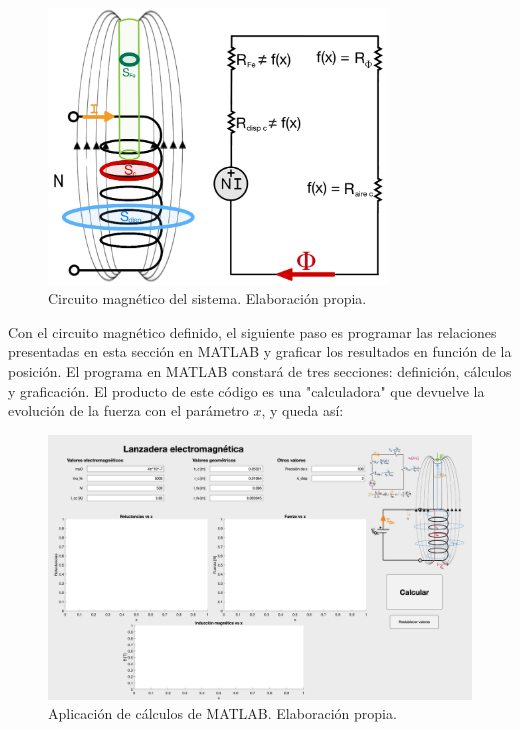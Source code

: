 \begin{figure}[H]
    \centering
    \includegraphics[width=9cm]{FigurasMemoria/circuitoMag.jpg}
    \caption{Circuito magnético del sistema. Elaboración propia.}
    \label{fig:circuitoMag} %
\end{figure}

Con el circuito magnético definido, el siguiente paso es programar las relaciones presentadas en esta sección en MATLAB y graficar los resultados en función de la posición. El programa en MATLAB constará de tres secciones: definición, cálculos y graficación. El producto de este código es una "calculadora" que devuelve la evolución de la fuerza con el parámetro \(x\), y queda así:

\begin{figure}[H]
    \centering
    \includegraphics[width=14cm]{FigurasMemoria/calculadora.png}
    \caption{Aplicación de cálculos de MATLAB. Elaboración propia.}
    \label{fig:calculadora} %
\end{figure}